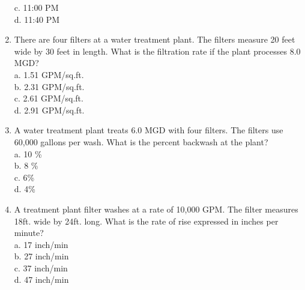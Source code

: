 \begin{enumerate}
c. 11:00 PM\\
d. 11:40 PM\\
\item There are four filters at a water treatment plant. The filters measure 20 feet wide by 30 feet in length. What is the filtration rate if the plant processes 8.0 MGD?\\
a. 1.51 GPM/sq.ft.\\
b. 2.31 GPM/sq.ft.\\
c. 2.61 GPM/sq.ft.\\
d. 2.91 GPM/sq.ft.\\
\item A water treatment plant treats 6.0 MGD with four filters. The filters use 60,000 gallons per wash. What is the percent backwash at the plant?\\
a. 10 \%\\
b. 8 \%\\
c. 6\%\\
d. 4\%\\
\item A treatment plant filter washes at a rate of 10,000 GPM. The filter measures 18ft. wide by 24ft. long. What is the rate of rise expressed in inches per minute?\\
a. 17 inch/min\\
b. 27 inch/min\\
c. 37 inch/min\\
d. 47 inch/min\\


\end{enumerate}
